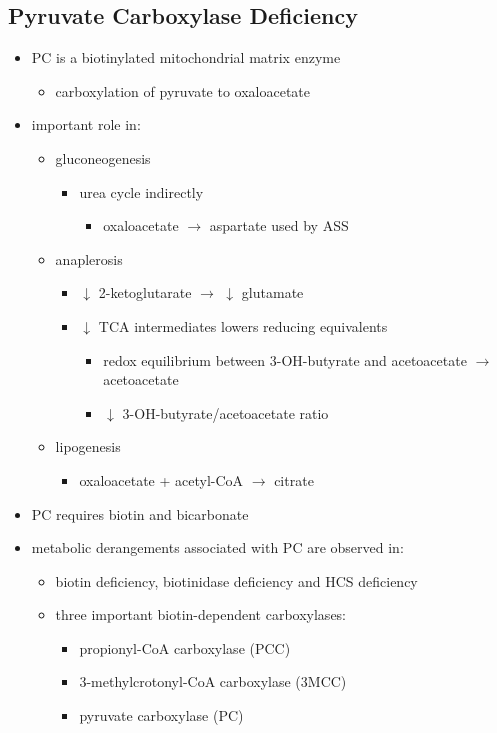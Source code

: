 \documentclass{scrartcl}
\begin{document}
\subsection{Pyruvate Carboxylase Deficiency}
\label{sec:org4071e4a}
\begin{itemize}
\item PC is a biotinylated mitochondrial matrix enzyme
\begin{itemize}
\item carboxylation of pyruvate to oxaloacetate
\end{itemize}


\item important role in:
\begin{itemize}
\item gluconeogenesis
\begin{itemize}
\item urea cycle indirectly
\begin{itemize}
\item oxaloacetate \(\to\) aspartate used by ASS
\end{itemize}
\end{itemize}
\item anaplerosis
\begin{itemize}
\item \(\downarrow\) 2-ketoglutarate \(\to\) \(\downarrow\) glutamate
\item \(\downarrow\) TCA intermediates lowers reducing equivalents
\begin{itemize}
\item redox equilibrium between 3-OH-butyrate and acetoacetate \(\to\) acetoacetate
\item \(\downarrow\) 3-OH-butyrate/acetoacetate ratio
\end{itemize}
\end{itemize}
\item lipogenesis
\begin{itemize}
\item oxaloacetate + acetyl-CoA \(\to\) citrate
\end{itemize}
\end{itemize}

\item PC requires biotin and bicarbonate
\item metabolic derangements associated with PC are observed in:
\begin{itemize}
\item biotin deficiency, biotinidase deficiency and HCS deficiency
\item three important biotin-dependent carboxylases:
\begin{itemize}
\item propionyl-CoA carboxylase (PCC)
\item 3-methylcrotonyl-CoA carboxylase (3MCC)
\item pyruvate carboxylase (PC)
\end{itemize}


\end{itemize}
\end{itemize}
\end{document}
